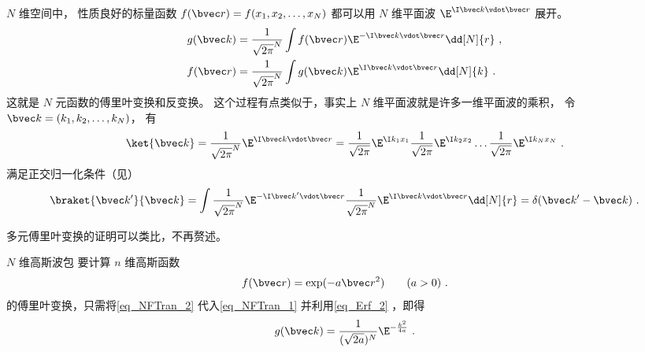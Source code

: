 

$N$ 维空间中， 性质良好的标量函数 $f(\bvec r) = f(x_1, x_2, \dots, x_N)$ 都可以用 $N$ 维平面波 $\E^{\I \bvec k\vdot \bvec r}$ 展开。
\begin{align}
g(\bvec k) &= \frac{1}{\sqrt{2\pi}^N} \int f(\bvec r) \E^{-\I \bvec k \vdot \bvec r} \dd[N]{r}\label{eq_NFTran_1}~,\\
f(\bvec r) &= \frac{1}{\sqrt{2\pi}^N} \int g(\bvec k) \E^{\I \bvec k \vdot \bvec r} \dd[N]{k}~.
\end{align}
这就是 $N$ 元函数的傅里叶变换和反变换。 这个过程有点类似于，事实上 $N$ 维平面波就是许多一维平面波的乘积， 令 $\bvec k = (k_1, k_2, \dots, k_N)$， 有
\begin{equation}
\ket{\bvec k} = \frac{1}{\sqrt{2\pi}^N}\E^{\I \bvec k \vdot \bvec r} = \frac{1}{\sqrt{2\pi}} \E^{\I k_1 x_1} \frac{1}{\sqrt{2\pi}} \E^{\I k_2 x_2} \dots \frac{1}{\sqrt{2\pi}} \E^{\I k_N x_N}~.
\end{equation}
满足正交归一化条件（见）
\begin{equation}
\braket{\bvec k'}{\bvec k} = \int \frac{1}{\sqrt{2\pi}^N}\E^{-\I \bvec k' \vdot \bvec r} \frac{1}{\sqrt{2\pi}^N}\E^{\I \bvec k \vdot \bvec r} \dd[N]{r} = \delta(\bvec k'- \bvec k)~.
\end{equation}

多元傅里叶变换的证明可以类比，不再赘述。

\begin{example}{$N$ 维高斯波包}
要计算 $n$ 维高斯函数
\begin{equation}\label{eq_NFTran_2}
f(\bvec r) = \exp(-a\bvec r^2) \qquad (a > 0)~.
\end{equation}
的傅里叶变换，只需将\autoref{eq_NFTran_2} 代入\autoref{eq_NFTran_1} 并利用\autoref{eq_Erf_2}  ，即得
\begin{equation}
g(\bvec k) = \frac{1}{(\sqrt{2a})^N}\E^{-\frac{k^2}{4a}}~.
\end{equation}
\end{example}
